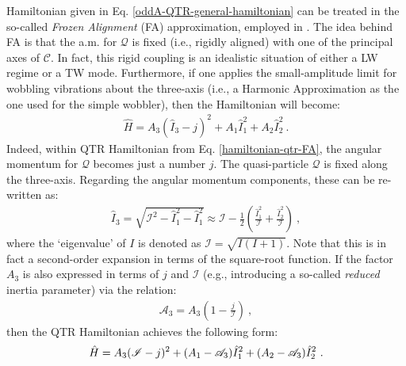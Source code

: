Hamiltonian given in Eq. \ref{oddA-QTR-general-hamiltonian} can be treated in the so-called \emph{Frozen Alignment} (FA) approximation, employed in \cite{frauendorf2014transverse}. The idea behind FA is that the a.m. for $\mathcal{Q}$ is fixed (i.e., rigidly aligned) with one of the principal axes of $\mathscr{C}$. In fact, this rigid coupling is an idealistic situation of either a LW regime or a TW mode. Furthermore, if one applies the small-amplitude limit for wobbling vibrations about the three-axis (i.e., a Harmonic Approximation as the one used for the simple wobbler), then the Hamiltonian will become:
\begin{align}
    \hat{H}=A_3(\hat{I}_3-j)^2+A_1\hat{I}_1^2+A_2\hat{I}_2^2\ .
    \label{hamiltonian-qtr-FA}
\end{align}
Indeed, within QTR Hamiltonian from Eq. \ref{hamiltonian-qtr-FA}, the angular momentum for $\mathcal{Q}$ becomes just a number $j$. The quasi-particle $\mathcal{Q}$ is fixed along the three-axis. Regarding the angular momentum components, these can be re-written as:
\begin{align}
    \hat{I}_3=\sqrt{\mathscr{I}^2-\hat{I}_1^2-\hat{I}_1^2}\approx\mathscr{I}-\frac{1}{2}\left(\frac{\hat{I}_1^2}{\mathscr{I}}+\frac{\hat{I}_2^2}{\mathscr{I}}\right)\ ,
\end{align}
where the `eigenvalue' of $I$ is denoted as $\mathscr{I}=\sqrt{I(I+1)}$. Note that this is in fact a second-order expansion in terms of the square-root function. If the factor $A_3$ is also expressed in terms of $j$ and $\mathscr{I}$ (e.g., introducing a so-called \emph{reduced} inertia parameter) via the relation:
\begin{align}
    \mathscr{A}_3=A_3\left(1-\frac{j}{\mathscr{I}}\right)\ ,
    \label{reduced-inertia-parameter-A3}
\end{align}
then the QTR Hamiltonian achieves the following form:
\begin{align}
    \hat{H}={\color{black}A_3(\mathscr{I}-j)^2}+{\color{black}(A_1-\mathscr{A}_3)\hat{I}_1^2+(A_2-\mathscr{A}_3)\hat{I}_2^2}\ .
    \label{HA-QTR-Hamiltonian}
\end{align}

